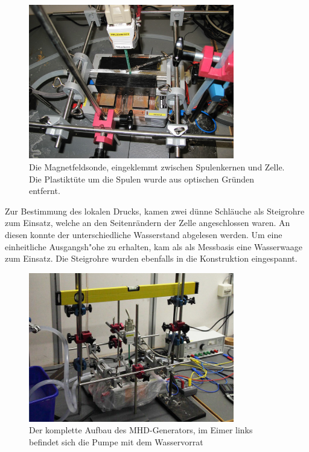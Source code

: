 \documentclass[11pt]{scrartcl}
\begin{document}
\begin{figure}[ht]
\begin{center}
\includegraphics[width=0.8\textwidth]{images/offen.jpg}
\end{center}
\vspace{-1.5\baselineskip}
\caption{Die Magnetfeldsonde, eingeklemmt zwischen Spulenkernen und Zelle. Die Plastikt\"ute um die Spulen wurde aus optischen Gr\"unden entfernt.}
\label{offen}
\end{figure}

Zur Bestimmung des lokalen Drucks, kamen zwei d\"unne Schl\"auche als Steigrohre zum Einsatz, welche an den Seitenr\"andern der Zelle angeschlossen waren. An diesen konnte der unterschiedliche Wasserstand abgelesen werden. Um eine einheitliche Ausgangsh"ohe zu erhalten, kam als als Messbasis eine Wasserwaage zum Einsatz. Die Steigrohre wurden ebenfalls in die Konstruktion eingespannt.

\begin{figure}[ht]
\begin{center}
\includegraphics[width=0.8\textwidth]{images/wwaage.jpg}
\end{center}
\vspace{-1.5\baselineskip}
\caption{Der komplette Aufbau des MHD-Generators, im Eimer links befindet sich die Pumpe mit dem Wasservorrat}
\label{wwaage}
\end{figure}
\end{document}
